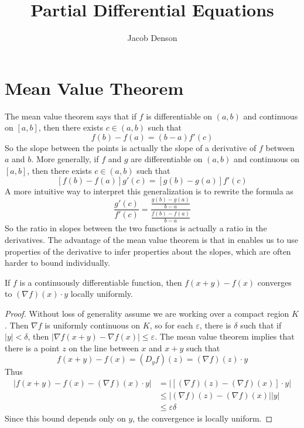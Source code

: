 

\title{Partial Differential Equations}
\author{Jacob Denson}




\maketitle

\tableofcontents


\chapter{Mean Value Theorem}

The mean value theorem says that if $f$ is differentiable on $(a,b)$ and continuous on $[a,b]$, then there exists $c \in (a,b)$ such that
%
\[ f(b) - f(a) = (b-a) f'(c) \]
%
So the slope between the points is actually the slope of a derivative of $f$ between $a$ and $b$. More generally, if $f$ and $g$ are differentiable on $(a,b)$ and continuous on $[a,b]$, then there exists $c \in (a,b)$ such that
%
\[ [f(b) - f(a)] g'(c) = [g(b) - g(a)] f'(c) \]
%
A more intuitive way to interpret this generalization is to rewrite the formula as
%
\[ \frac{g'(c)}{f'(c)} = \frac{\frac{g(b) - g(a)}{b - a}}{\frac{f(b) - f(a)}{b - a}} \]
%
So the ratio in slopes between the two functions is actually a ratio in the derivatives. The advantage of the mean value theorem is that in enables us to use properties of the derivative to infer properties about the slopes, which are often harder to bound individually.

\begin{theorem}
	If $f$ is a continuously differentiable function, then $f(x+y) - f(x)$ converges to $(\nabla f)(x) \cdot y$ locally uniformly.
\end{theorem}
\begin{proof}
	Without loss of generality assume we are working over a compact region $K$. Then $\nabla f$ is uniformly continuous on $K$, so for each $\varepsilon$, there is $\delta$ such that if $|y| < \delta$, then $|\nabla f(x+y) - \nabla f(x)| \leq \varepsilon$. The mean value theorem implies that there is a point $z$ on the line between $x$ and $x + y$ such that
	\[ f(x+y) - f(x) = (D_y f)(z) = (\nabla f)(z) \cdot y \]
	Thus
	\begin{align*}
		\left| f(x+y) - f(x) - (\nabla f)(x) \cdot y \right| &= |[(\nabla f)(z) - (\nabla f)(x)] \cdot y|\\
		&\leq |(\nabla f)(z) - (\nabla f)(x)||y|\\
		&\leq \varepsilon \delta
	\end{align*}
	Since this bound depends only on $y$, the convergence is locally uniform.
\end{proof}

